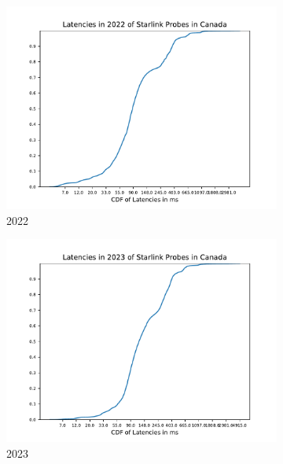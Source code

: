 \begin{figure}
	\centering
	\begin{subfigure}[b]{0.3\linewidth}
		\includegraphics[width=\linewidth]{chapters/4-results/latency/img/cdf_latencies_in_2022_of_starlink_probes_in_canada.pdf}
		\caption{2022}
	\end{subfigure}
	\begin{subfigure}[b]{0.3\linewidth}
		\includegraphics[width=\linewidth]{chapters/4-results/latency/img/cdf_latencies_in_2023_of_starlink_probes_in_canada.pdf}
		\caption{2023}
	\end{subfigure}
	\begin{subfigure}[b]{0.3\linewidth}

\end{subfigure}
\end{figure}
